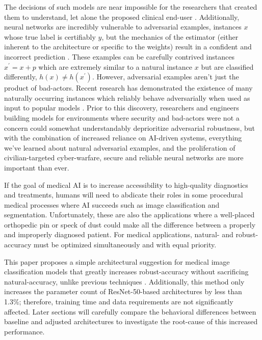 \documentclass[10pt,twocolumn,letterpaper]{article}
\begin{document}
  The decisions of such models are near impossible for the researchers that created them to understand, let alone the proposed clinical end-user \cite{Med-XAI}. Additionally, neural networks are incredibly vulnerable to adversarial examples, instances $x$ whose true label is certifiably $y$, but the mechanics of the estimator (either inherent to the architecture or specific to the weights) result in a confident and incorrect prediction \cite{Intro-Adv}. These examples can be carefully contrived instances $x^\prime = x + p$ which are extremely similar to a natural instance $x$ but are classified differently, $h(x) \not = h(x^\prime)$. However, adversarial examples aren't just the product of bad-actors. Recent research has demonstrated the existence of many naturally occurring instances which reliably behave adversarially when used as input to popular models \cite{Natural-Adv}. Prior to this discovery, researchers and engineers building models for environments where security and bad-actors were not a concern could somewhat understandably deprioritize adversarial robustness, but with the combination of increased reliance on AI-driven systems, everything we've learned about natural adversarial examples, and the proliferation of civilian-targeted cyber-warfare, secure and reliable neural networks are more important than ever.

  If the goal of medical AI is to increase accessibility to high-quality diagnostics and treatments, humans will need to abdicate their roles in some procedural medical processes where AI succeeds such as image classification and segmentation. Unfortunately, these are also the applications where a well-placed orthopedic pin or speck of dust could make all the difference between a properly and improperly diagnosed patient. For medical applications, natural- and robust-accuracy must be optimized simultaneously and with equal priority.

  This paper proposes a simple architectural suggestion for medical image classification models that greatly increases robust-accuracy without sacrificing natural-accuracy, unlike previous techniques \cite{RobustVsAccuracy}. Additionally, this method only increases the parameter count of ResNet-50-based \cite{ResNet} architectures by less than 1.3\%; therefore, training time and data requirements are not significantly affected. Later sections will carefully compare the behavioral differences between baseline and adjusted architectures to investigate the root-cause of this increased performance.
\end{document}
